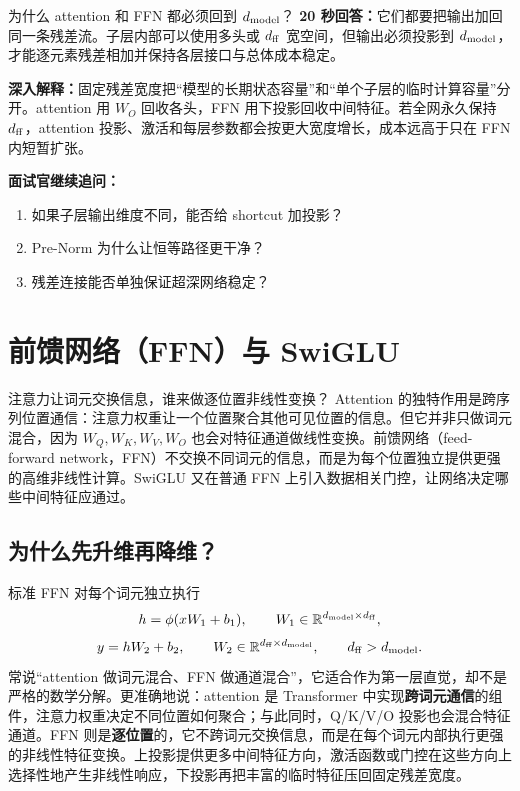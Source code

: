 \begin{interviewbox}{为什么 attention 和 FFN 都必须回到 $d_{\rm model}$？}
\textbf{20 秒回答：}它们都要把输出加回同一条残差流。子层内部可以使用多头或 $d_{\rm ff}$ 宽空间，但输出必须投影到 $d_{\rm model}$，才能逐元素残差相加并保持各层接口与总体成本稳定。

\textbf{深入解释：}固定残差宽度把“模型的长期状态容量”和“单个子层的临时计算容量”分开。attention 用 $W_O$ 回收各头，FFN 用下投影回收中间特征。若全网永久保持 $d_{\rm ff}$，attention 投影、激活和每层参数都会按更大宽度增长，成本远高于只在 FFN 内短暂扩张。

\textbf{面试官继续追问：}
\begin{enumerate}
  \item 如果子层输出维度不同，能否给 shortcut 加投影？
  \item Pre-Norm 为什么让恒等路径更干净？
  \item 残差连接能否单独保证超深网络稳定？
\end{enumerate}
\end{interviewbox}

\section{前馈网络（FFN）与 SwiGLU}
\label{sec:ffn}

\begin{motivationbox}{注意力让词元交换信息，谁来做逐位置非线性变换？}
Attention 的独特作用是跨序列位置通信：注意力权重让一个位置聚合其他可见位置的信息。但它并非只做词元混合，因为 $W_Q,W_K,W_V,W_O$ 也会对特征通道做线性变换。前馈网络（feed-forward network，FFN）不交换不同词元的信息，而是为每个位置独立提供更强的高维非线性计算。SwiGLU 又在普通 FFN 上引入数据相关门控，让网络决定哪些中间特征应通过。
\end{motivationbox}

\subsection{为什么先升维再降维？}

标准 FFN 对每个词元独立执行
\[
h=\phi(xW_1+b_1),\qquad
W_1\in\mathbb R^{d_{\rm model}\times d_{\rm ff}},
\]
\[
y=hW_2+b_2,\qquad
W_2\in\mathbb R^{d_{\rm ff}\times d_{\rm model}},
\qquad d_{\rm ff}>d_{\rm model}.
\]
常说“attention 做词元混合、FFN 做通道混合”，它适合作为第一层直觉，却不是严格的数学分解。更准确地说：attention 是 Transformer 中实现\textbf{跨词元通信}的组件，注意力权重决定不同位置如何聚合；与此同时，Q/K/V/O 投影也会混合特征通道。FFN 则是\textbf{逐位置}的，它不跨词元交换信息，而是在每个词元内部执行更强的非线性特征变换。上投影提供更多中间特征方向，激活函数或门控在这些方向上选择性地产生非线性响应，下投影再把丰富的临时特征压回固定残差宽度。

